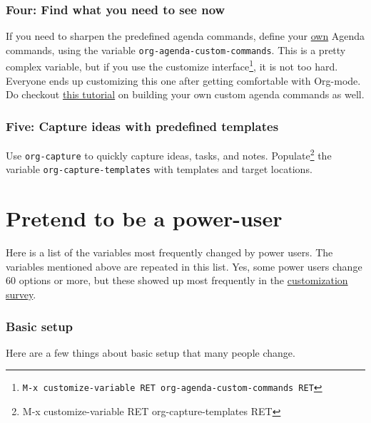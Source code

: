 \documentclass[11pt]{article}
\begin{document}
\subsubsection*{Four: Find what you need to see now}
\label{sec:org7eec36f}

If you need to sharpen the predefined agenda commands, define your \href{http://orgmode.org/manual/Custom-agenda-views.html\#Custom-agenda-views}{own}
Agenda commands, using the variable \texttt{org-agenda-custom-commands}.
This is a pretty complex variable, but if you use the customize
interface\footnote{\texttt{M-x customize-variable RET
org-agenda-custom-commands RET}}, it is not too hard.  Everyone
ends up customizing this one after getting comfortable with Org-mode.
Do checkout \href{http://orgmode.org/worg/org-tutorials/org-custom-agenda-commands.php}{this tutorial} on building your own custom agenda commands
as well.

\subsubsection*{Five: Capture ideas with predefined templates}
\label{sec:org8b0dc48}


Use \texttt{org-capture} to quickly capture ideas, tasks, and notes.
Populate\footnote{M-x customize-variable RET org-capture-templates RET}
the variable \texttt{org-capture-templates} with templates and target
locations.

\section*{Pretend to be a power-user}
\label{sec:org0385701}

Here is a list of the variables most frequently changed by power
users.  The variables mentioned above are repeated in this list.  Yes,
some power users change 60 options or more, but these showed up most
frequently in the \href{http://orgmode.org/worg/org-configs/org-customization-survey.php}{customization survey}.

\subsubsection*{Basic setup}
\label{sec:org0bd758c}


Here are a few things about basic setup that many people change.
\end{document}
